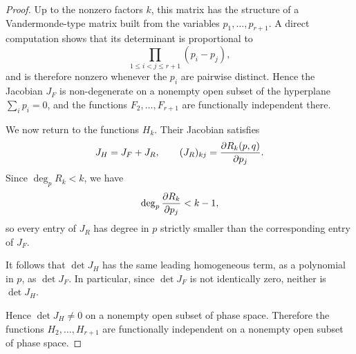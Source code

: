 \begin{proof}
    Up to the nonzero factors $k$, this matrix has the structure of a Vandermonde-type matrix built from the variables $p_1,\dots,p_{r+1}$.
    A direct computation shows that its determinant is proportional to
    \begin{equation}
        \prod_{1 \le i < j \le r+1} (p_i - p_j),
    \end{equation}
    and is therefore nonzero whenever the $p_i$ are pairwise distinct.
    Hence the Jacobian $J_F$ is non-degenerate on a nonempty open subset of the hyperplane $\sum_i p_i=0$, and the functions $F_2,\dots,F_{r+1}$ are functionally independent there.

    We now return to the functions $H_k$. Their Jacobian satisfies
    \begin{equation}
        J_H = J_F + J_R,
        \qquad
        (J_R)_{kj} = \pdv{R_k(p,q)}{p_j}.
    \end{equation}
    Since $\deg_p R_k < k$, we have
    \begin{equation}
        \deg_p \pdv{R_k}{p_j} < k-1,
    \end{equation}
    so every entry of $J_R$ has degree in $p$ strictly smaller than the corresponding entry of $J_F$.

    It follows that $\det J_H$ has the same leading homogeneous term, as a polynomial in $p$, as $\det J_F$.
    In particular, since $\det J_F$ is not identically zero, neither is $\det J_H$.

    Hence $\det J_H \neq 0$ on a nonempty open subset of phase space.
    Therefore the functions $H_2,\dots,H_{r+1}$ are functionally independent on a nonempty open subset of phase space.
\end{proof}
